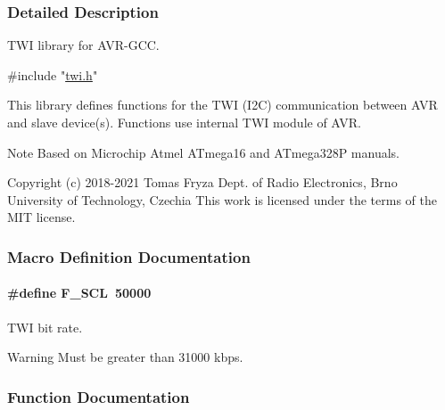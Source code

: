 \subsubsection{Detailed Description}
T\+WI library for A\+V\+R-\/\+G\+CC. 


\begin{DoxyCode}
\textcolor{preprocessor}{#include "\hyperlink{a00004}{twi.h}"} 
\end{DoxyCode}


This library defines functions for the T\+WI (I2C) communication between A\+VR and slave device(s). Functions use internal T\+WI module of A\+VR.

\begin{DoxyNote}{Note}
Based on Microchip Atmel A\+Tmega16 and A\+Tmega328P manuals. 
\end{DoxyNote}
\begin{DoxyCopyright}{Copyright}
(c) 2018-\/2021 Tomas Fryza Dept. of Radio Electronics, Brno University of Technology, Czechia This work is licensed under the terms of the M\+IT license. 
\end{DoxyCopyright}


\subsubsection{Macro Definition Documentation}
\paragraph[{\texorpdfstring{F\+\_\+\+S\+CL}{F_SCL}}]{\setlength{\rightskip}{0pt plus 5cm}\#define F\+\_\+\+S\+CL~50000}\hypertarget{a00007_ga7a1c522bed64982971384489ee477bd3}{}\label{a00007_ga7a1c522bed64982971384489ee477bd3}


T\+WI bit rate. 

\begin{DoxyWarning}{Warning}
Must be greater than 31000 kbps. 
\end{DoxyWarning}


\subsubsection{Function Documentation}
